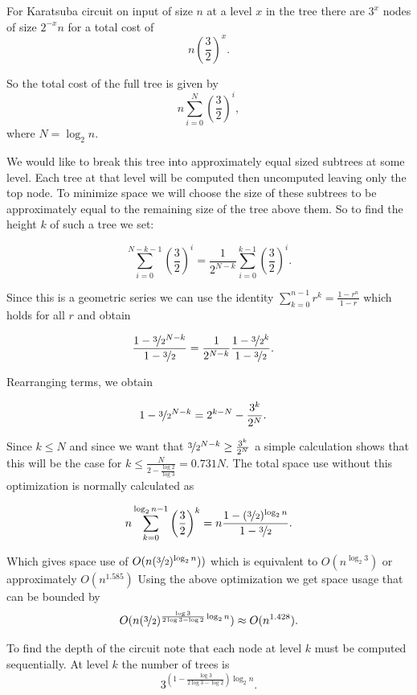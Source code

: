 For Karatsuba circuit on input of size $n$ at a level $x$ in the tree there
are $3^x$ nodes of size $2^{-x}n$ for a total cost of
\[
n\left(\frac{3}{2}\right)^x.
\]

So the total cost of the full tree is given by
\[
    n\sum_{i=0}^{N} \left(\frac{3}{2}\right)^i,
\]
where $N=\log_2 n$.

We would like to break this tree into approximately equal sized subtrees at
some level.  Each tree at that level will be computed then uncomputed
leaving only the top node. To minimize space we will choose the size of
these subtrees to be approximately equal to the remaining size of the tree
above them.  So to find the height $k$ of such a tree we set:

\[
    \sum_{i=0}^{N-k-1} \left(\frac{3}{2}\right)^i = \frac{1}{2^{N-k}}\sum_{i=0}^{k-1} \left(\frac{3}{2}\right)^i.
\]

Since this is a geometric series we can use the identity $\sum_{k=0}^{n-1} r^k
= \frac{1-r^n}{1-r}$ which holds for all $r$ and obtain

\begin{align*}
    \frac{1- \nicefrac{3}{2}^{N-k}}{1 - \nicefrac{3}{2}} &= \frac{1}{2^{N-k}}\frac{1- \nicefrac{3}{2}^{k}}{1 - \nicefrac{3}{2}}.
\end{align*}

Rearranging terms, we obtain

\begin{align*}
    1- \nicefrac{3}{2}^{N-k} &= 2^{k-N} - \frac{3^k}{2^N}.
\end{align*}

Since $k\leq N$ and since we want that $\nicefrac{3}{2}^{N-k} \geq
\frac{3^k}{2^N}$ a simple calculation shows that this will be the case for $k
\leq \frac{N}{ 2- \frac{\log 2}{\log 3}} = 0.731N$. The total space use without
this optimization is normally calculated as

\[
    n\sum_{k=0}^{\log_2 n - 1} \left(\frac{3}{2}\right)^k = n\frac{1-(\nicefrac{3}{2})^{\log_2 n}}{1-\nicefrac{3}{2}}.
\]

Which gives space use of $O(n(\nicefrac{3}{2})^{\log_2 n}))$ which is
equivalent to $O(n^{\log_2 3})$ or approximately $O(n^{1.585})$
Using the above optimization we get space usage that can be bounded by
\[
    O(n(\nicefrac{3}{2})^{\frac{\log 3}{ 2\log 3 - \log 2}\log_2 n}) \approx O(n^{1.428}).
\]

To find the depth of the circuit note that each node at level $k$ must be
computed sequentially. At level $k$ the number of trees is
\[
    3^{\left(1-\frac{\log 3}{ 2\log 3 - \log 2}\right)\log_2 n}.
\]

